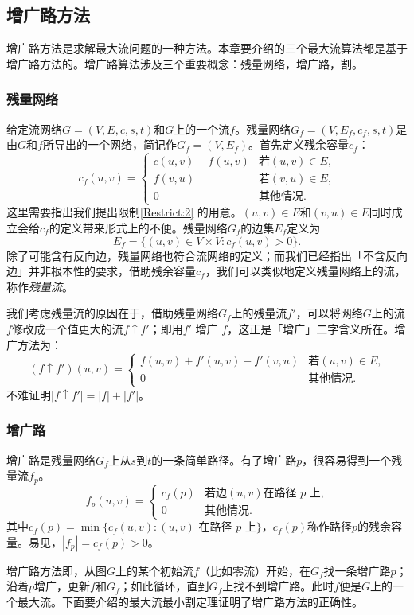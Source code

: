\documentclass[a4paper]{ctexbook}
\begin{document}
  \subsection{增广路方法}
  增广路方法是求解最大流问题的一种方法。本章要介绍的三个最大流算法都是基于增广路方法的。增广路算法涉及三个重要概念：残量网络，增广路，割。
  \subsubsection*{残量网络}
  给定流网络$G=(V,E,c,s,t)$和$G$上的一个流$f$。残量网络$G_f=(V,E_f,c_f, s, t)$是由$G$和$f$所导出的一个网络，简记作$G_f=(V,E_f)$。首先定义残余容量$c_f$：
  \[
  c_f(u,v) =
  \begin{cases}
    c(u,v) - f(u,v) & \text{若$(u,v)\in E$,}\\
    f(v,u) & \text{若$(v,u)\in E$,} \\
    0 & \text{其他情况.}
  \end{cases}
  \]
  这里需要指出我们提出限制\ref{Restrict:2} 的用意。$(u,v)\in E$和$(v,u)\in E$同时成立会给$c_f$的定义带来形式上的不便。残量网络$G_f$的边集$E_f$定义为
  \[
  E_f = \{(u,v)\in V\times V\colon c_f(u,v)>0\}.
  \]
  除了可能含有反向边，残量网络也符合流网络的定义；而我们已经指出「不含反向边」并非根本性的要求，借助残余容量$c_f$，我们可以类似地定义残量网络上的流，称作\emph{残量流}。

  我们考虑残量流的原因在于，借助残量网络$G_f$上的残量流$f'$，可以将网络$G$上的流$f$修改成一个值更大的流$f\uparrow f'$；即用$f'$ 增广 $f$，这正是「增广」二字含义所在。增广方法为：
  \[
  (f\uparrow f')(u,v) =\begin{cases}
  f(u,v) + f'(u,v) - f'(v,u) & \text{若$(u,v)\in E$,} \\
  0 & \text{其他情况.}
\end{cases}
  \]
  不难证明$|f\uparrow f'| = |f| + |f'|$。
  \subsubsection{增广路}
  增广路是残量网络$G_f$上从$s$到$t$的一条简单路径。有了增广路$p$，很容易得到一个残量流$f_p$。
  \[
  f_p(u,v) =\begin{cases}
  c_f(p) & \text{若边$(u,v)$在路径 $p$ 上,}\\
  0 & \text{其他情况.}
\end{cases}
  \]
  其中$c_f(p) = \min\{c_f(u,v)\colon (u,v)\text{ 在路径 }p\text{ 上} \}$，$c_f(p)$称作路径$p$的残余容量。易见，$|f_p| = c_f(p) > 0$。

  增广路方法即，从图$G$上的某个初始流$f$（比如零流）开始，在$G_f$找一条增广路$p$；沿着$p$增广，更新$f$和$G_f$；如此循环，直到$G_f$上找不到增广路。此时$f$便是$G$上的一个最大流。下面要介绍的最大流最小割定理证明了增广路方法的正确性。
\end{document}

